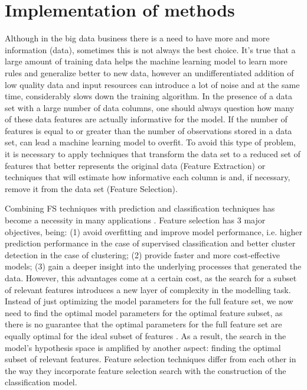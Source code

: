 \chapter{Implementation of methods}
\label{cha:implementation_methods}
\hspace{10px}Although in the big data business there is a need to have more and more information (data), sometimes this is not always the best choice. It's true that a large amount of training data helps the machine learning model to learn more rules and generalize better to new data, however an undifferentiated addition of low quality data and input resources can introduce a lot of noise and at the same time, considerably slows down the training algorithm. In the presence of a data set with a large number of data columns, one should always question how many of these data features are actually informative for the model. If the number of features is equal to or greater than the number of observations stored in a data set, can lead a machine learning model to overfit. To avoid this type of problem, it is necessary to apply techniques that transform the data set to a reduced set of features that better represents the original data (Feature Extraction) or techniques that will estimate how informative each column is and, if necessary, remove it from the data set (Feature Selection).

Combining FS techniques with prediction and classification techniques has become a necessity in many applications \cite{LiuH} \cite{Elisseeff}. Feature selection has 3 major objectives, being: (1) avoid overfitting and improve model performance, i.e. higher prediction performance in the case of supervised classification and better cluster detection in the case of clustering; (2) provide faster and more cost-effective models; (3) gain a deeper insight into the underlying processes that generated the data. However, this advantages come at a certain cost, as the search for a subset of relevant features introduces a new layer of complexity in the modelling task. Instead of just optimizing the model parameters for the full feature set, we now need to find the optimal model parameters for the optimal feature subset, as there is no guarantee that the optimal parameters for the full feature set are equally optimal for the ideal subset of features \cite{Daelemans2003CombinedOO}. As a result, the search in the model's hypothesis space is amplified by another aspect: finding the optimal subset of relevant features. Feature selection techniques differ from each other in the way they incorporate feature selection search with the construction of the classification model.

